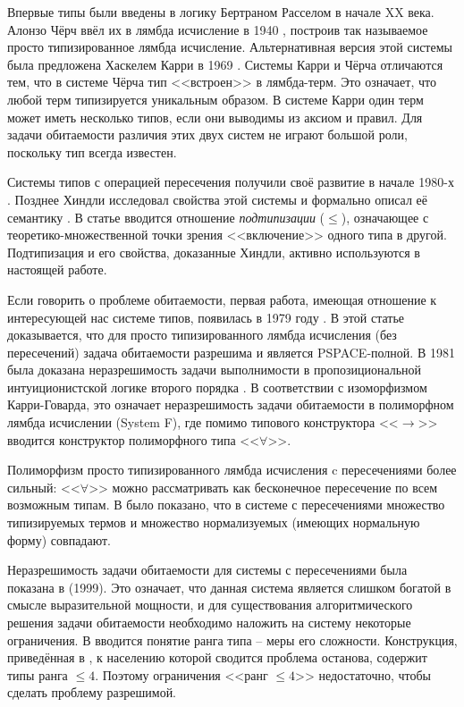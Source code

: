 \documentclass[../main.tex]{subfiles}
\begin{document}
 \label{sec:domain_review}

Впервые типы были введены в логику Бертраном Расселом в начале XX века. Алонзо Чёрч ввёл их в лямбда исчисление в 1940 \cite{church_1940}, построив так называемое просто типизированное лямбда исчисление. Альтернативная версия этой системы была предложена Хаскелем Карри в 1969 \cite{curry_1969}. Системы Карри и Чёрча отличаются тем, что в системе Чёрча тип <<встроен>> в лямбда-терм. Это означает, что любой терм типизируется уникальным образом. В системе Карри один терм может иметь несколько типов, если они выводимы из аксиом и правил. Для задачи обитаемости различия этих двух систем не играют большой роли, поскольку тип всегда известен.

Системы типов с операцией пересечения получили своё развитие в начале 1980-х \cite{coppo_1980, coppo_1981}. Позднее Хиндли исследовал свойства этой системы и формально описал её семантику \cite{hindley_1982}. В статье вводится отношение {\it подтипизации} ($\leqslant$), означающее с теоретико-множественной точки зрения <<включение>> одного типа в другой.  Подтипизация и его свойства, доказанные Хиндли, активно используются в настоящей работе. 

Если говорить о проблеме обитаемости, первая работа, имеющая отношение к интересующей нас системе типов, появилась в 1979 году \cite{statman_1979}. В этой статье доказывается, что для просто типизированного лямбда исчисления (без пересечений) задача обитаемости разрешима и является PSPACE-полной. В 1981 была доказана неразрешимость задачи выполнимости в пропозициональной интуиционистской логике второго порядка \cite{gabbay_1981}. В соответствии с изоморфизмом Карри-Говарда, это означает неразрешимость задачи обитаемости в полиморфном лямбда исчислении (System F), где помимо типового конструктора <<$\to$>> вводится конструктор полиморфного типа <<$\forall$>>.

Полиморфизм просто типизированного лямбда исчисления c пересечениями более сильный: <<$\forall$>> можно рассматривать как бесконечное пересечение по всем возможным типам. В \cite{pottinger_1980} было показано, что в системе с пересечениями множество типизируемых термов и множество нормализуемых (имеющих нормальную форму) совпадают. 

Неразрешимость задачи обитаемости для системы с пересечениями была показана в \cite{urzyczyn_1999} (1999). %
Это означает, что данная система является слишком богатой в смысле выразительной мощности, и для существования алгоритмического решения задачи обитаемости необходимо наложить на систему некоторые ограничения. В \cite{leivant_1983} вводится понятие ранга типа -- меры его сложности. Конструкция, приведённая в \cite{urzyczyn_1999}, к населению которой сводится проблема останова, содержит типы ранга $\leqslant 4$. Поэтому ограничения <<ранг $\leqslant 4$>> недостаточно, чтобы сделать проблему разрешимой. 
\end{document}
